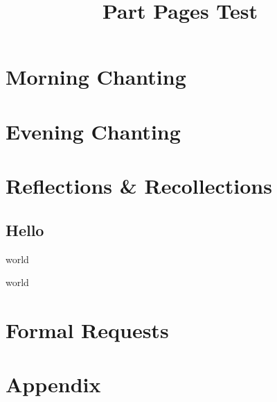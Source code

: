 \documentclass[
  babelLanguage=english,
  final,
  showtrims,
]{chantingbook}
\title{Part Pages Test}
\begin{document}
\mainmatter

\part{Morning Chanting}

\part{Evening Chanting}

\part{Reflections \& Recollections}

\chapter{Hello}

world

\clearpage

world

\part{Formal Requests}

\part{Appendix}
\end{document}
